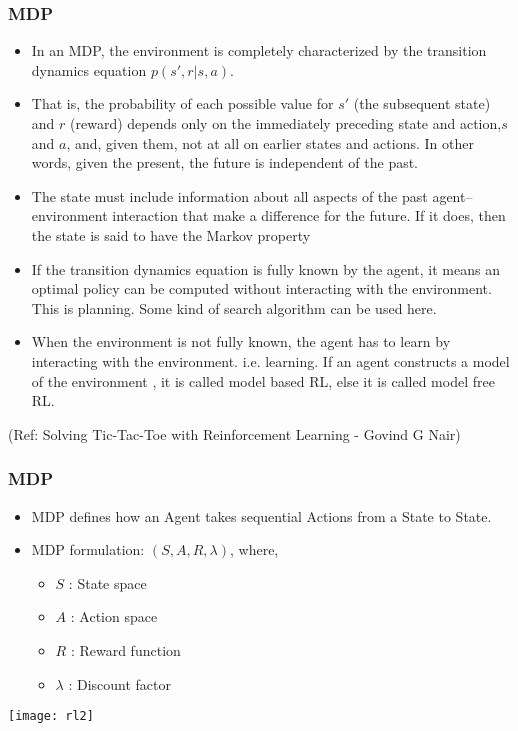 \begin{frame}[fragile]\frametitle{MDP}


\begin{itemize}
\item In an MDP, the environment is completely characterized by the transition dynamics equation $p(s',r|s,a)$.
\item That is, the probability of each possible value for $s'$ (the subsequent state) and $r$ (reward) depends only on the immediately preceding state and action,$s$ and $a$, and, given them, not at all on earlier states and actions. In other words, given the present, the future is independent of the past.
\item The state must include information about all aspects of the past agent–environment interaction that make a difference for the future. If it does, then the state is said to have the Markov property
\item If the transition dynamics equation is fully known by the agent, it means an optimal policy can be computed without interacting with the environment. This is planning. Some kind of search algorithm can be used here.
\item When the environment is not fully known, the agent has to learn by interacting with the environment. i.e. learning. If an agent constructs a model of the environment , it is called model based RL, else it is called model free RL.
\end{itemize}



{\tiny (Ref: Solving Tic-Tac-Toe with Reinforcement Learning - Govind G Nair)}

\end{frame}



\begin{frame}[fragile]\frametitle{MDP}

\begin{itemize}
\item MDP defines how an Agent takes sequential Actions from a State to State.
\item MDP formulation: $(S,A,R,\lambda)$, where,
	\begin{itemize}
	\item $S$ : State space
	\item $A$ : Action space
	\item $R$ : Reward function
	\item $\lambda$ : Discount factor
	\end{itemize}
\end{itemize}

\begin{center}
\texttt{[image: rl2]}
\end{center}

\end{frame}

